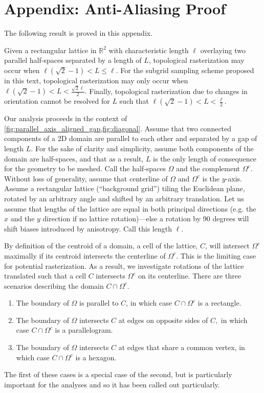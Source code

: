 \section{Appendix: Anti-Aliasing Proof}

The following result is proved in this appendix.

\begin{theorem}
Given a rectangular lattice in $\mathbb{R}^2$ with characteristic length $\ell$ overlaying two parallel half-spaces separated by a length of $L$, topological rasterization may occur when $\ell(\sqrt{2}-1)<L\leq\ell$.
For the subgrid sampling scheme proposed in this text, topological rasterization may only occur when $\ell(\sqrt{2}-1)<L<\frac{\sqrt{2}\ell}{2}.$
Finally, topological rasterization due to changes in orientation cannot be resolved for $L$ such that $\ell(\sqrt{2}-1)<L<\frac{\ell}{2}.$
\end{theorem}

Our analysis proceeds in the context of \cref{fig:parallel_axis_aligned_gap,fig:diagonal}.
Assume that two connected components of a 2D domain are parallel to each other and separated by a gap of length $L$.
For the sake of clarity and simplicity, assume both components of the domain are half-spaces, and that as a result, $L$ is the only length of consequence for the geometry to be meshed.
Call the half-spaces $\Omega$ and the complement $\Omega^c$.
Without loss of generality, assume that centerline of $\Omega$ and $\Omega^c$ is the $y$-axis.
Assume a rectangular lattice (``background grid'') tiling the Euclidean plane, rotated by an arbitrary angle and shifted by an arbitrary translation.
Let us assume that lengths of the lattice are equal in both principal directions (e.g. the $x$ and the $y$ direction if no lattice rotation)---else a rotation by 90 degrees will shift biases introduced by anisotropy.
Call this length $\ell$.

By definition of the centroid of a domain, a cell of the lattice, $C$, will intersect $\Omega^c$ maximally if its centroid intersects the centerline of $\Omega^c$.
This is the limiting case for potential rasterization.
As a result, we investigate rotations of the lattice translated such that a cell $C$ intersects $\Omega^c$ on its centerline.
There are three scenarios describing the domain $C\cap \Omega^c$.
\begin{enumerate}
	\item The boundary of $\Omega$ is parallel to $C$, in which case $C \cap \Omega^c$ is a rectangle. %
	\item The boundary of $\Omega$ intersects $C$ at edges on opposite sides of $C,$ in which case $C\cap \Omega^c$ is a parallelogram. %
	\item The boundary of $\Omega$ intersects $C$ at edges that share a common vertex, in which case $C \cap \Omega^c$ is a hexagon.
\end{enumerate}
The first of these cases is a special case of the second, but is particularly important for the analyses and so it has been called out particularly.

